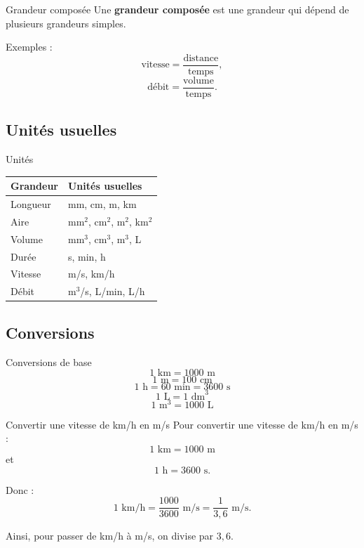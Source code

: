 \documentclass[11pt,a4paper]{article}
\begin{document}
\begin{definitionbox}{Grandeur composée}
Une \textbf{grandeur composée} est une grandeur qui dépend de plusieurs grandeurs simples.

Exemples :
\[
\text{vitesse}=\frac{\text{distance}}{\text{temps}},
\]
\[
\text{débit}=\frac{\text{volume}}{\text{temps}}.
\]
\end{definitionbox}

\subsection{Unités usuelles}

\begin{retenirbox}{Unités}
\begin{center}
\begin{tabularx}{0.9\linewidth}{|X|X|}
\hline
\textbf{Grandeur} & \textbf{Unités usuelles} \\
\hline
Longueur & mm, cm, m, km \\
\hline
Aire & mm$^2$, cm$^2$, m$^2$, km$^2$ \\
\hline
Volume & mm$^3$, cm$^3$, m$^3$, L \\
\hline
Durée & s, min, h \\
\hline
Vitesse & m/s, km/h \\
\hline
Débit & m$^3$/s, L/min, L/h \\
\hline
\end{tabularx}
\end{center}
\end{retenirbox}

\subsection{Conversions}

\begin{retenirbox}{Conversions de base}
\[
1\text{ km}=1000\text{ m}
\]
\[
1\text{ m}=100\text{ cm}
\]
\[
1\text{ h}=60\text{ min}=3600\text{ s}
\]
\[
1\text{ L}=1\text{ dm}^3
\]
\[
1\text{ m}^3=1000\text{ L}
\]
\end{retenirbox}

\begin{methodbox}{Convertir une vitesse de km/h en m/s}
Pour convertir une vitesse de km/h en m/s :
\[
1\text{ km}=1000\text{ m}
\]
et
\[
1\text{ h}=3600\text{ s}.
\]

Donc :
\[
1\text{ km/h}=\frac{1000}{3600}\text{ m/s}=\frac{1}{3{,}6}\text{ m/s}.
\]

Ainsi, pour passer de km/h à m/s, on divise par $3{,}6$.
\end{methodbox}
\end{document}
